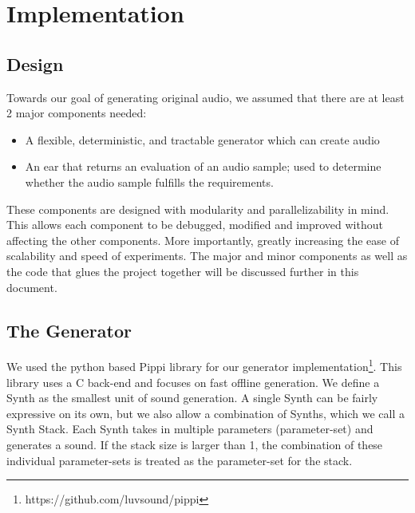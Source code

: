 \documentclass{article}
\begin{document}

\section{Implementation}
\subsection{Design}
Towards our goal of generating original audio, we assumed that there are at least 2 major components needed:
\begin{itemize}
    \item A flexible, deterministic, and tractable generator which can create audio
    \item An ear that returns an evaluation of an audio sample; used to determine whether the audio sample fulfills the requirements. 
\end{itemize}

These components are designed with modularity and parallelizability in mind. This allows each component to be debugged, modified and improved without affecting the other components. More importantly, greatly increasing the ease of scalability and speed of experiments.
The major and minor components as well as the code that glues the project together will be discussed further in this document. 

\subsection{The Generator}
We used the python based Pippi library for our generator implementation\footnote{https://github.com/luvsound/pippi}. This library uses a C back-end and focuses on fast offline generation. We define a Synth as the smallest unit of sound generation. A single Synth can be fairly expressive on its own, but we also allow a combination of Synths, which we call a Synth Stack. Each Synth takes in multiple parameters (parameter-set) and generates a sound. If the stack size is larger than 1, the combination of these individual parameter-sets is treated as the parameter-set for the stack. 
\end{document}
